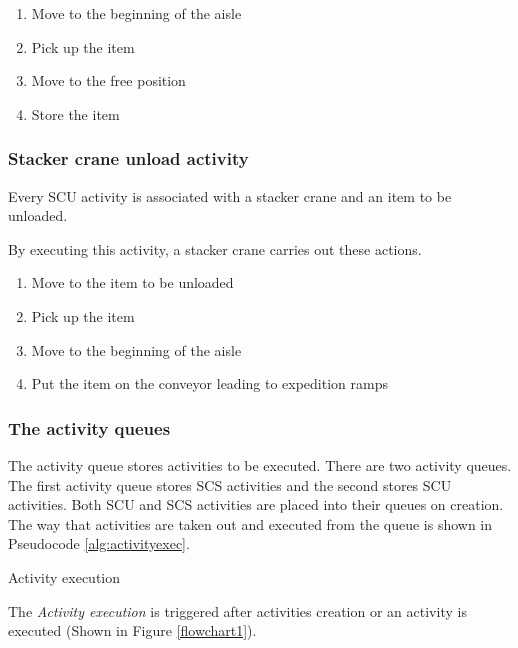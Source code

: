 \documentclass{ctuthesis}
\begin{document}
\begin{enumerate}
    \item Move to the beginning of the aisle
    \item Pick up the item
    \item Move to the free position
    \item Store the item
\end{enumerate}

\subsubsection{Stacker crane unload activity}

Every SCU activity is associated with a stacker crane and an item to be unloaded.

By executing this activity, a stacker crane carries out these actions.

\begin{enumerate}
    \item Move to the item to be unloaded
    \item Pick up the item
    \item Move to the beginning of the aisle
    \item Put the item on the conveyor leading to expedition ramps
\end{enumerate}

\subsubsection{The activity queues}
\label{subsec:activityqueue}

 The activity queue stores activities to be executed. There are two activity queues. The first activity queue stores SCS activities and the second stores SCU activities. Both SCU and SCS activities are placed into their queues on creation. The way that activities are taken out and executed from the queue is shown in Pseudocode \ref{alg:activityexec}.

\begin{algorithm}[H]
\SetAlgoLined
{
}
\caption{Activity execution}
\label{alg:activityexec}
\end{algorithm}

The \emph{Activity execution} is triggered after activities creation or an activity is executed (Shown in Figure \ref{flowchart1}).
\end{document}
